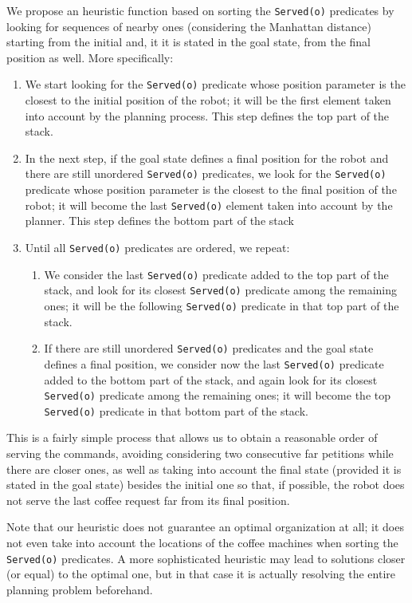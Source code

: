 \documentclass[12pt,a4paper,oneside]{article}
\numberwithin{equation}{section}
\numberwithin{equation}{section}
\theoremstyle{definition}
\begin{document}
We propose an heuristic function based on sorting the \texttt{Served(o)} predicates by looking for sequences of nearby ones (considering the Manhattan distance) starting from the initial and, it it is stated in the goal state, from the final position as well. More specifically:
\begin{enumerate}
	\item We start looking for the \texttt{Served(o)} predicate whose position parameter is the closest to the initial position of the robot; it will be the first element taken into account by the planning process. This step defines the top part of the stack.
	\item In the next step, if the goal state defines a final position for the robot and there are still unordered \texttt{Served(o)} predicates, we look for the \texttt{Served(o)} predicate whose position parameter is the closest to the final position of the robot; it will become the last \texttt{Served(o)} element taken into account by the planner. This step defines the bottom part of the stack
	\item Until all \texttt{Served(o)} predicates are ordered, we repeat:
	\begin{enumerate}
		\item We consider the last \texttt{Served(o)} predicate added to the top part of the stack, and look for its closest \texttt{Served(o)} predicate among the remaining ones; it will be the following \texttt{Served(o)} predicate in that top part of the stack.
		\item If there are still unordered \texttt{Served(o)} predicates and the goal state defines a final position, we consider now the last \texttt{Served(o)} predicate added to the bottom part of the stack, and again look for its closest \texttt{Served(o)} predicate among the remaining ones; it will become the top \texttt{Served(o)} predicate in that bottom part of the stack.
	\end{enumerate}
\end{enumerate}
This is a fairly simple process that allows us to obtain a reasonable order of serving the commands, avoiding considering two consecutive far petitions while there are closer ones, as well as taking into account the final state (provided it is stated in the goal state) besides the initial one so that, if possible, the robot does not serve the last coffee request far from its final position. 


Note that our heuristic does not guarantee an optimal organization at all; it does not even take into account the locations of the coffee machines when sorting the \texttt{Served(o)} predicates. A more sophisticated heuristic may lead to solutions closer (or equal) to the optimal one, but in that case it is actually resolving the entire planning problem beforehand.
\end{document}
